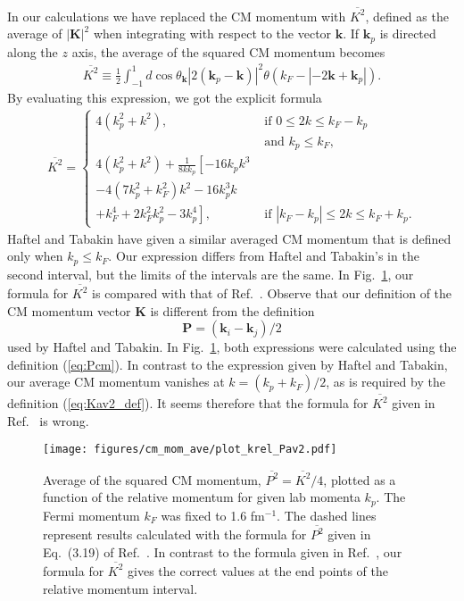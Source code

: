 \documentclass[a4paper,12pt]{report}
\begin{document}
In our calculations we have replaced the CM momentum with $\overline{K^{2}}$, defined as the average of $|\mathbf{K}|^{2}$ when integrating with respect to the vector $\mathbf{k}$. If $\mathbf{k}_{p}$ is directed along the $z$ axis, the average of the squared CM momentum becomes 
\begin{align}
  \overline{K^{2}} \equiv \frac{1}{2}\int_{-1}^{1}d\cos \theta_{\mathbf{k}}\left|2(\mathbf{k}_{p}-\mathbf{k})\right|^{2}\theta(k_{F}-|-2\mathbf{k}+\mathbf{k}_{p}|).
  \label{eq:Kav2_def}
\end{align}
By evaluating this expression, we got the explicit formula
\begin{align}
  \overline{K^{2}} = \left\{ \begin{array}{ll}
    4(k_{p}^{2} + k^{2}), & \text{ if } 0 \leq 2k \leq k_{F}-k_{p} \\ 
    & \text{ and } k_{p} \leq k_{F}, \\
    4(k_{p}^{2} + k^{2}) + \frac{1}{8kk_{p}}\left[ -16k_{p}k^{3} \right. & \\
     -4(7k_{p}^{2} + k_{F}^{2})k^{2} - 16k_{p}^{3}k & \\
     + \left. k_{F}^{4} + 2k_{F}^{2}k_{p}^{2} - 3k_{p}^{4} \right], & \text{ if } |k_{F} - k_{p}| \leq 2k \leq k_{F} + k_{p}.
    \end{array} \right.
  \label{eq:Kav2}
\end{align}
Haftel and Tabakin \cite{haftel_tabakin} have given a similar averaged CM momentum that is defined only when $k_{p} \leq k_{F}$. Our expression differs from Haftel and Tabakin's in the second interval, but the limits of the intervals are the same. In Fig.~\ref{fig:cm_mom_ave}, our formula for $\overline{K^{2}}$ is compared with that of Ref.~\cite{haftel_tabakin}. Observe that our definition of the CM momentum vector $\mathbf{K}$ is different from the definition
\begin{equation}
  \mathbf{P} = (\mathbf{k}_{i}-\mathbf{k}_{j})/2
  \label{eq:Pcm}
\end{equation}
used by Haftel and Tabakin. In Fig.~\ref{fig:cm_mom_ave}, both expressions 
were calculated using the definition (\ref{eq:Pcm}). In contrast to the 
expression given by Haftel and Tabakin, our average CM momentum vanishes 
at $k = (k_{p} + k_{F})/2$, as is required by the definition 
(\ref{eq:Kav2_def}). It seems therefore that the formula for $\overline{K^{2}}$
given in Ref.~\cite{haftel_tabakin} is wrong.


\begin{figure}
  \centering
  \texttt{[image: figures/cm\_mom\_ave/plot\_krel\_Pav2.pdf]}
  \caption{Average of the squared CM momentum, $\overline{P^{2}} = \overline{K^{2}}/4$, plotted as a function of the relative momentum for given lab momenta $k_{p}$. The Fermi momentum $k_{F}$ was fixed to 1.6 fm$^{-1}$. The dashed lines represent results calculated with the formula for $\overline{P^{2}}$ given in Eq.~(3.19) of Ref.~\cite{haftel_tabakin}. In contrast to the formula given in Ref.~\cite{haftel_tabakin}, our formula for $\overline{K^{2}}$ gives the correct values at the end points of the relative momentum interval.}  
  \label{fig:cm_mom_ave}
\end{figure}
\end{document}
